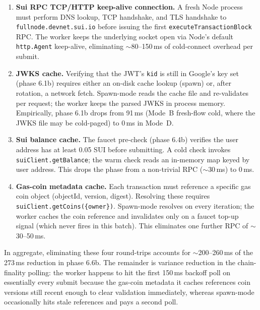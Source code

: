 \begin{enumerate}\itemsep0pt

  \item \textbf{Sui RPC TCP/HTTP keep-alive connection.} A fresh Node
        process must perform DNS lookup, TCP handshake, and TLS
        handshake to \texttt{fullnode.devnet.sui.io} before issuing the
        first \texttt{executeTransactionBlock} RPC. The worker keeps
        the underlying socket open via Node's default
        \texttt{http.Agent} keep-alive, eliminating
        \(\sim\)80--150\,ms of cold-connect overhead per submit.

  \item \textbf{JWKS cache.} Verifying that the JWT's \texttt{kid} is
        still in Google's key set (phase 6.1b) requires either an
        on-disk cache lookup (spawn) or, after rotation, a network
        fetch. Spawn-mode reads the cache file and re-validates
        per request; the worker keeps the parsed JWKS in process memory.
        Empirically, phase 6.1b drops from 91\,ms (Mode~B fresh-flow
        cold, where the JWKS file may be cold-paged) to 0\,ms in Mode~D.

  \item \textbf{Sui balance cache.} The faucet pre-check (phase 6.4b)
        verifies the user address has at least 0.05 SUI before
        submitting. A cold check invokes
        \texttt{suiClient.getBalance}; the warm check reads an
        in-memory map keyed by user address. This drops the phase from
        a non-trivial RPC ($\sim$30\,ms) to 0\,ms.

  \item \textbf{Gas-coin metadata cache.} Each transaction must
        reference a specific gas coin object (objectId, version,
        digest). Resolving these requires
        \texttt{suiClient.getCoins(\{owner\})}. Spawn-mode resolves on
        every iteration; the worker caches the coin reference and
        invalidates only on a faucet top-up signal (which never fires
        in this batch). This eliminates one further RPC of
        \(\sim\)30--50\,ms.

\end{enumerate}

\noindent
In aggregate, eliminating these four round-trips accounts for
\(\sim\)200--260\,ms of the 273\,ms reduction in phase 6.6b. The
remainder is variance reduction in the chain-finality polling: the
worker happens to hit the first 150\,ms backoff poll on essentially
every submit because the gas-coin metadata it caches references coin
versions still recent enough to clear validation immediately, whereas
spawn-mode occasionally hits stale references and pays a second poll.

